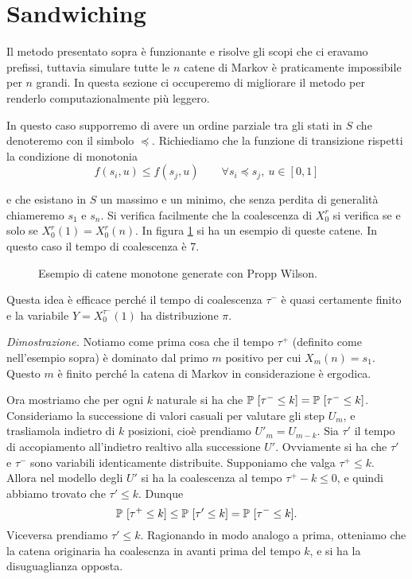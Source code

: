 \documentclass[]{marticle}
\begin{document}
\section{Sandwiching}

Il metodo presentato sopra \`e funzionante e risolve gli scopi che ci eravamo
prefissi, tuttavia simulare tutte le $n$ catene di Markov \`e praticamente
impossibile per $n$ grandi. In questa sezione ci occuperemo di migliorare il
metodo per renderlo computazionalmente pi\`u leggero.
 
In questo caso supporremo di avere un ordine parziale tra gli stati in $S$ che
denoteremo con il simbolo $\preceq$. Richiediamo che la funzione di transizione
rispetti la condizione di monotonia
\[
    f(s_i, u) \leq f(s_j, u) \qquad \forall s_i \preceq s_j,\ u \in [0,1]
\]

e che esistano in $S$ un massimo e un minimo, che senza perdita di generalit\`a
chiameremo $s_1$ e $s_n$. Si verifica facilmente che la coalescenza di $X^r_0$
si verifica se e solo se $X^r_0(1) = X^r_0(n)$. In figura \ref{fig:im2} si ha un
esempio di queste catene. In questo caso il tempo di coalescenza \`e 7.

\begin{figure}[h!]

\caption{Esempio di catene monotone generate con Propp Wilson.}
\label{fig:im2}
\centering
\end{figure}

Questa idea \`e efficace perch\'e il tempo di coalescenza $\tau^-$ \`e quasi
certamente finito e la variabile $Y=X^{\tau^-}_0(1)$ ha distribuzione $\pi$.

\textit{Dimostrazione.} Notiamo come prima cosa che il tempo $\tau^+$ (definito
come nell'esempio sopra) \`e dominato dal primo $m$ positivo per cui $X_m(n) =
s_1$. Questo $m$ \`e finito perch\'e la catena di Markov in considerazione \`e
ergodica. 

Ora mostriamo che per ogni $k$ naturale si ha che $\mathbb{P}\ [\tau^- \leq k] =
\mathbb{P}\ [\tau^- \leq k]$. Consideriamo la successione di valori casuali per
valutare gli step $U_m$, e trasliamola indietro di $k$ posizioni, cio\`e
prendiamo $U'_m = U_{m-k}$. Sia $\tau'$ il tempo di accopiamento all'indietro
realtivo alla successione $U'$. Ovviamente si ha che $\tau'$ e $\tau^-$ sono
variabili identicamente distribuite. Supponiamo che valga $\tau^+ \leq k$.
Allora nel modello degli $U'$ si ha la coalescenza al tempo $\tau^+ - k  \leq
0$, e quindi abbiamo trovato che $\tau' \leq k$. Dunque
\[
    \mathbb{P}\ [ \tau^+ \leq k] \leq \mathbb{P}\ [ \tau' \leq k] = \mathbb{P}\ [ \tau^- \leq k].
\]
Viceversa prendiamo $\tau' \leq k$. Ragionando in modo analogo a prima,
otteniamo che la catena originaria ha coalescnza in avanti prima del tempo $k$,
e si ha la disuguaglianza opposta.
\end{document}
